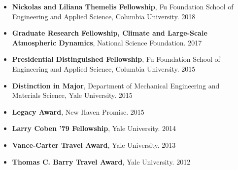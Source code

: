 \documentclass[11pt,article,oneside]{memoir}
\begin{document}
\mbox{}\vspace{-\dimexpr\baselineskip\relax}

\begin{itemize}[label={}]

  \item \textbf{Nickolas and Liliana Themelis Fellowship}, Fu Foundation School of Engineering and Applied Science, Columbia University. 2018

  \item \textbf{Graduate Research Fellowship, Climate and Large-Scale Atmospheric Dynamics}, National Science Foundation. 2017

  \item \textbf{Presidential Distinguished Fellowship}, Fu Foundation School of Engineering and Applied Science, Columbia University. 2015

  \item \textbf{Distinction in Major}, Department of Mechanical Engineering and Materials Science, Yale University. 2015

  \item \textbf{Legacy Award}, New Haven Promise. 2015

  \item \textbf{Larry Coben ’79 Fellowship}, Yale University. 2014

  \item \textbf{Vance-Carter Travel Award}, Yale University. 2013

  \item \textbf{Thomas C. Barry Travel Award}, Yale University. 2012

\end{itemize}


%
%
%
%  
%        
%        
\end{document}
